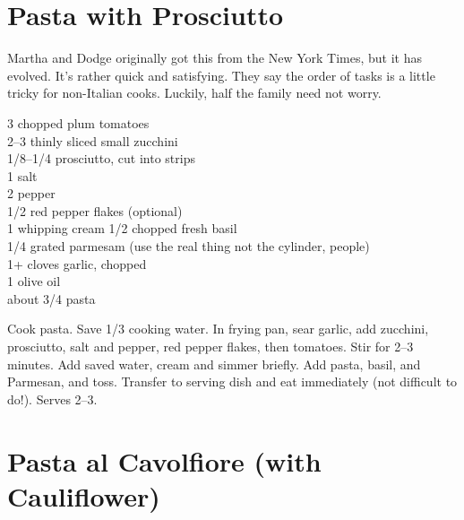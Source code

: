 \section{Pasta with Prosciutto}

\begin{open}
  Martha and Dodge originally got this from the New York Times, but it has
  evolved. It's rather quick and satisfying. They say the order of tasks is a
  little tricky for non-Italian cooks. Luckily, half the family need not worry.
\end{open}
\begin{ingredients}
  \SI{3}{\cup} chopped plum tomatoes\\
  \numrange{2}{3} thinly sliced small zucchini\\
  \SIrange{1/8}{1/4}{\pound} prosciutto, cut into strips\\
  \SI{1}{\teaspoon} salt\\
  \SI{2}{\teaspoon} pepper\\
  \SI{1/2}{\teaspoon} red pepper flakes (optional)\\
  \SI{1}{\cup} whipping cream
  \SI{1/2}{\cup} chopped fresh basil\\
  \SI{1/4}{\cup} grated parmesam (use the real thing not the cylinder, people)\\
  1+ cloves garlic, chopped\\
  \SI{1}{\tblspoon} olive oil\\
  about \SI{3/4}{\pound} pasta
\end{ingredients}
Cook pasta. Save \SI{1/3}{\cup} cooking water. In frying pan, sear garlic, add
zucchini, prosciutto, salt and pepper, red pepper flakes, then tomatoes.  Stir
for \numrange{2}{3} minutes.  Add saved water, cream and simmer briefly. Add
pasta, basil, and Parmesan, and toss. Transfer to serving dish and eat
immediately (not difficult to do!). Serves \numrange{2}{3}.

\section{Pasta al Cavolfiore (with Cauliflower)
}

